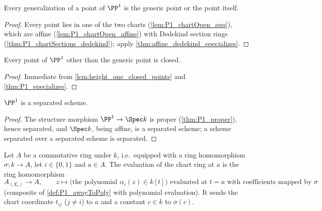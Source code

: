 \begin{theorem}
  \label{thm:P1_specializes}
  \leanok
  Every generalization of a point of \(\PP^1\) is the generic point or the point itself.
\end{theorem}
\begin{proof}
  \leanok
  Every point lies in one of the two charts (\ref{lem:P1_chartOpen_sup}), which are affine
  (\ref{lem:P1_chartOpen_affine}) with Dedekind section rings
  (\ref{thm:P1_chartSections_dedekind}); apply \ref{thm:affine_dedekind_specializes}.
\end{proof}

\begin{lemma}
  \label{lem:P1_closed_points}
  \leanok
  Every point of \(\PP^1\) other than the generic point is closed.
\end{lemma}
\begin{proof}
  \leanok
  Immediate from \ref{lem:height_one_closed_points} and \ref{thm:P1_specializes}.
\end{proof}

\begin{theorem}
  \label{thm:P1_separated}
  \leanok
  \(\PP^1\) is a separated scheme.
\end{theorem}
\begin{proof}
  \leanok
  The structure morphism \(\PP^1 \to \Spec k\) is proper (\ref{thm:P1_proper}), hence
  separated, and \(\Spec k\), being affine, is a separated scheme; a scheme separated over
  a separated scheme is separated.
\end{proof}

\begin{definition}
  \label{def:P1_chartEval}
  \leanok
  Let \(A\) be a commutative ring under \(k\), i.e.\ equipped with a ring homomorphism
  \(\sigma : k \to A\), let \(i \in \{0,1\}\) and \(a \in A\). The evaluation of the chart
  ring at \(a\) is the ring homomorphism
  \[
    A_{(X_i)} \longrightarrow A, \qquad
    z \longmapsto \bigl(\text{the polynomial } \alpha_i(z) \in k[t]\bigr)
      \text{ evaluated at } t = a \text{ with coefficients mapped by } \sigma
  \]
  (composite of \ref{def:P1_awayToPoly} with polynomial evaluation). It sends the chart
  coordinate \(t_{ij}\) (\(j \neq i\)) to \(a\) and a constant \(c \in k\) to \(\sigma(c)\).
\end{definition}

